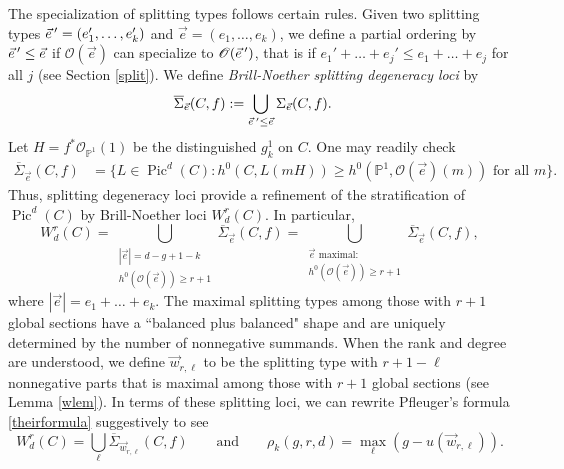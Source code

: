 \documentclass[12pt]{amsart}
\newcommand{\pp}{\mathbb{P}}
\renewcommand{\O}{\mathscr{O}}
\DeclareMathOperator{\Pic}{Pic}
\newcommand{\ee}{{\vec{e}} \nobreak\hspace{.16667em plus .08333em}'}
\newcommand{\Sigmabar}{\overline{\Sigma}}
\newcommand{\e}{\vec{e}}
\theoremstyle{definition}
\theoremstyle{remark}
\theoremstyle{remark}
\numberwithin{equation}{section}
\begin{document}
The specialization of splitting types follows certain rules. Given two splitting types $\ee = (e_1', \ldots, e_k')$ and $\e = (e_1, \ldots, e_k)$, we define a partial ordering by $\ee \leq \e$ if $\O(\e)$ can specialize to $\O(\ee)$, that is if $e_1' + \ldots + e_j' \leq e_1 + \ldots + e_j$ for all $j$ (see Section \ref{split}).
We define \textit{Brill-Noether splitting degeneracy loci} by
\begin{align*}
\Sigmabar_{\vec{e}}(C, f) &:= \bigcup_{\ee \leq \e} \Sigma_{\vec{e}}(C, f).
\end{align*}
Let $H = f^*\O_{\pp^1}(1)$ be the distinguished $g^1_k$ on $C$. One may readily check
\begin{align*}
\Sigmabar_{\vec{e}}(C, f) &= \{L \in \Pic^d(C) : h^0(C, L(mH)) \geq h^0(\pp^1, \O(\vec{e})(m)) \text{ for all } m\}.
\end{align*}
Thus, splitting degeneracy loci provide a refinement of the stratification of $\Pic^d(C)$ by Brill-Noether loci $W^r_d(C)$.
In particular,
\begin{equation} \label{W}
W^r_d(C) = \bigcup_{\substack{|\vec{e}| = d - g + 1- k \\ h^0(\O(\vec{e})) \geq r+1}} \Sigmabar_{\vec{e}}(C, f) = \bigcup_{\substack{\vec{e} \text{ maximal:} \\ h^0(\O(\vec{e})) \geq r+ 1}}\Sigmabar_{\vec{e}}(C, f),
\end{equation}
where $|\vec{e}| = e_1 + \ldots + e_k$. The maximal splitting types among those with $r+1$ global sections have  a ``balanced plus balanced" shape and are uniquely determined by the number of nonnegative summands.
 When the rank and degree are understood, we define $\vec{w}_{r,\ell}$ to be the splitting type with $r+1 - \ell$ nonnegative parts that is maximal among those with $r+1$ global sections (see Lemma \ref{wlem}). In terms of these splitting loci, we can rewrite Pfleuger's formula \eqref{theirformula} suggestively to see
 \[W^r_d(C) = \bigcup_{\ell} \Sigmabar_{\vec{w}_{r,\ell}}(C, f) \qquad \text{and} \qquad \rho_k(g, r, d) = \max_{\ell} \left( g - u(\vec{w}_{r,\ell}) \right).\]
\end{document}
